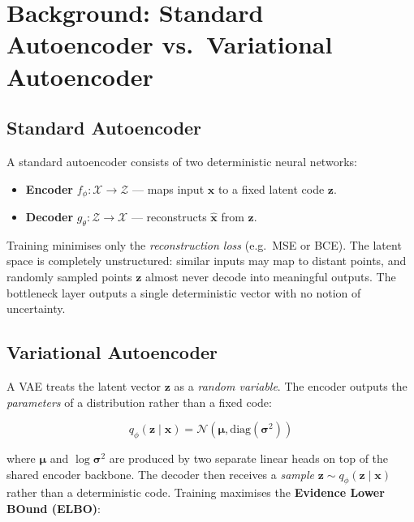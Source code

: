\documentclass[12pt,a4paper]{article}
\begin{document}
\section{Background: Standard Autoencoder vs.\ Variational Autoencoder}

\subsection{Standard Autoencoder}

A standard autoencoder consists of two deterministic neural networks:
\begin{itemize}
    \item \textbf{Encoder} $f_\phi: \mathcal{X} \rightarrow \mathcal{Z}$ — maps input $\mathbf{x}$ to a fixed latent code $\mathbf{z}$.
    \item \textbf{Decoder} $g_\theta: \mathcal{Z} \rightarrow \mathcal{X}$ — reconstructs $\hat{\mathbf{x}}$ from $\mathbf{z}$.
\end{itemize}

Training minimises only the \emph{reconstruction loss} (e.g.\ MSE or BCE). The latent space is completely unstructured: similar inputs may map to distant points, and randomly sampled points $\mathbf{z}$ almost never decode into meaningful outputs. The bottleneck layer outputs a single deterministic vector with no notion of uncertainty.

\subsection{Variational Autoencoder}

A VAE treats the latent vector $\mathbf{z}$ as a \emph{random variable}. The encoder outputs the \emph{parameters} of a distribution rather than a fixed code:

\begin{equation}
    q_\phi(\mathbf{z} \mid \mathbf{x}) = \mathcal{N}\!\left(\boldsymbol{\mu}, \mathrm{diag}(\boldsymbol{\sigma}^2)\right)
\end{equation}

where $\boldsymbol{\mu}$ and $\log\boldsymbol{\sigma}^2$ are produced by two separate linear heads on top of the shared encoder backbone. The decoder then receives a \emph{sample} $\mathbf{z} \sim q_\phi(\mathbf{z} \mid \mathbf{x})$ rather than a deterministic code. Training maximises the \textbf{Evidence Lower BOund (ELBO)}:
\end{document}
